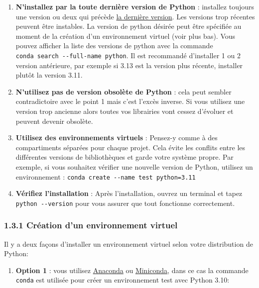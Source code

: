 \documentclass[
]{article}
\providecommand{\tightlist}{%
  \setlength{\itemsep}{0pt}\setlength{\parskip}{0pt}}
\begin{document}
\begin{enumerate}
\def\labelenumi{\arabic{enumi}.}
\item
  \textbf{N'installez par la toute dernière version de Python} :
  installez toujours une version ou deux qui précède
  \href{https://www.python.org/downloads/}{la dernière version}. Les
  versions trop récentes peuvent être instables. La version de python
  désirée peut être spécifiée au moment de la création d'un
  environnement virtuel (voir plus bas). Vous pouvez afficher la liste
  des versions de python avec la commande
  \texttt{conda\ search\ -\/-full-name\ python}. Il est recommandé
  d'installer 1 ou 2 version antérieure, par exemple si 3.13 est la
  version plus récente, installer plutôt la version 3.11.
\item
  \textbf{N'utilisez pas de version obsolète de Python} : cela peut
  sembler contradictoire avec le point 1 mais c'est l'excès inverse. Si
  vous utilisez une version trop ancienne alors toutes vos librairies
  vont cessez d'évoluer et peuvent devenir obsolète.
\item
  \textbf{Utilisez des environnements virtuels} : Pensez-y comme à des
  compartiments séparées pour chaque projet. Cela évite les conflits
  entre les différentes versions de bibliothèques et garde votre système
  propre. Par exemple, si vous souhaitez vérifier une nouvelle version
  de Python, utilisez un environnement :
  \texttt{conda\ create\ -\/-name\ test\ python=3.11}
\item
  \textbf{Vérifiez l'installation} : Après l'installation, ouvrez un
  terminal et tapez \texttt{python\ -\/-version} pour vous assurer que
  tout fonctionne correctement.
\end{enumerate}

\label{sec-00-01}
\subsubsection{\texorpdfstring{{1.3.1} Création d'un environnement
virtuel}{1.3.1 Création d'un environnement virtuel}}\label{cruxe9ation-dun-environnement-virtuel}

Il y a deux façons d'installer un environnement virtuel selon votre
distribution de Python:

\begin{enumerate}
\def\labelenumi{\arabic{enumi}.}
\tightlist
\item
  \textbf{Option 1} : vous utilisez
  \href{https://www.anaconda.com/download}{Anaconda} ou
  \href{https://docs.anaconda.com/miniconda/miniconda-install/}{Miniconda},
  dans ce cas la commande \texttt{conda} est utilisée pour créer un
  environnement test avec Python 3.10:
\end{enumerate}
\end{document}
